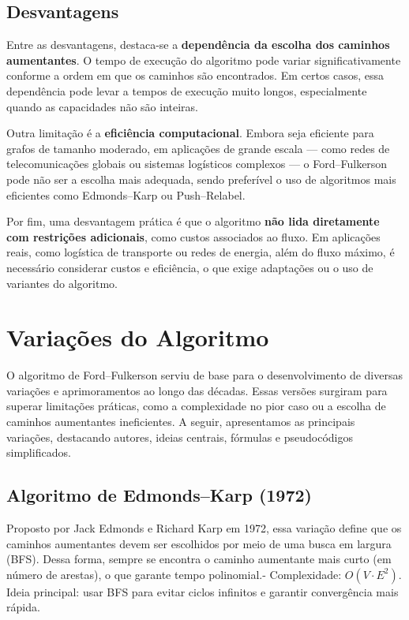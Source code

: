 \documentclass[12pt]{article}
\begin{document}
\subsection{Desvantagens}

Entre as desvantagens, destaca-se a \textbf{dependência da escolha dos caminhos aumentantes}. O tempo de execução do algoritmo pode variar significativamente conforme a ordem em que os caminhos são encontrados. Em certos casos, essa dependência pode levar a tempos de execução muito longos, especialmente quando as capacidades não são inteiras.

Outra limitação é a \textbf{eficiência computacional}. Embora seja eficiente para grafos de tamanho moderado, em aplicações de grande escala — como redes de telecomunicações globais ou sistemas logísticos complexos — o Ford–Fulkerson pode não ser a escolha mais adequada, sendo preferível o uso de algoritmos mais eficientes como Edmonds–Karp ou Push–Relabel.

Por fim, uma desvantagem prática é que o algoritmo \textbf{não lida diretamente com restrições adicionais}, como custos associados ao fluxo. Em aplicações reais, como logística de transporte ou redes de energia, além do fluxo máximo, é necessário considerar custos e eficiência, o que exige adaptações ou o uso de variantes do algoritmo.


\section{Variações do Algoritmo} \label{sec:variacoes}

O algoritmo de Ford–Fulkerson serviu de base para o desenvolvimento de diversas variações e aprimoramentos ao longo das décadas. Essas versões surgiram para superar limitações práticas, como a complexidade no pior caso ou a escolha de caminhos aumentantes ineficientes. A seguir, apresentamos as principais variações, destacando autores, ideias centrais, fórmulas e pseudocódigos simplificados.\n\n

\subsection{Algoritmo de Edmonds–Karp (1972)}

Proposto por Jack Edmonds e Richard Karp em 1972, essa variação define que os caminhos aumentantes devem ser escolhidos por meio de uma busca em largura (BFS). Dessa forma, sempre se encontra o caminho aumentante mais curto (em número de arestas), o que garante tempo polinomial.- Complexidade: $O(V \cdot E^2)$. Ideia principal: usar BFS para evitar ciclos infinitos e garantir convergência mais rápida.
\end{document}
